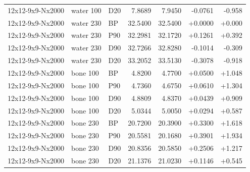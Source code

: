 \begin{center}
{\begin{tabular}{lllrrrr}
12x12-9x9-Nx2000 & water 100 & D20 & 7.8689 & 7.9450 & -0.0761 & -0.958\\
12x12-9x9-Nx2000 & water 230 & BP & 32.5400 & 32.5400 & +0.0000 & +0.000\\
12x12-9x9-Nx2000 & water 230 & P90 & 32.2981 & 32.1720 & +0.1261 & +0.392\\
12x12-9x9-Nx2000 & water 230 & D90 & 32.7266 & 32.8280 & -0.1014 & -0.309\\
12x12-9x9-Nx2000 & water 230 & D20 & 33.2052 & 33.5130 & -0.3078 & -0.918\\
12x12-9x9-Nx2000 & bone 100 & BP & 4.8200 & 4.7700 & +0.0500 & +1.048\\
12x12-9x9-Nx2000 & bone 100 & P90 & 4.7360 & 4.6750 & +0.0610 & +1.304\\
12x12-9x9-Nx2000 & bone 100 & D90 & 4.8809 & 4.8370 & +0.0439 & +0.909\\
12x12-9x9-Nx2000 & bone 100 & D20 & 5.0344 & 5.0050 & +0.0294 & +0.587\\
12x12-9x9-Nx2000 & bone 230 & BP & 20.7200 & 20.3900 & +0.3300 & +1.618\\
12x12-9x9-Nx2000 & bone 230 & P90 & 20.5581 & 20.1680 & +0.3901 & +1.934\\
12x12-9x9-Nx2000 & bone 230 & D90 & 20.8356 & 20.5850 & +0.2506 & +1.217\\
12x12-9x9-Nx2000 & bone 230 & D20 & 21.1376 & 21.0230 & +0.1146 & +0.545\\
\bottomrule
\end{tabular}%
}
\end{center}

